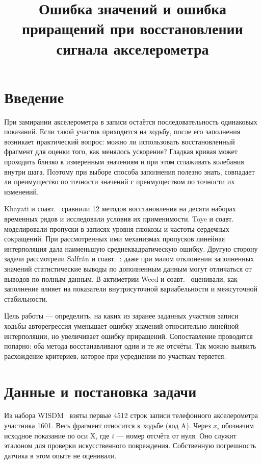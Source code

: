 \documentclass{misisarticle}
\title{Ошибка значений и ошибка приращений при восстановлении сигнала акселерометра}
\begin{document}
\maketitle
\section{Введение}
При замирании акселерометра в записи остаётся последовательность одинаковых показаний. Если такой участок приходится на ходьбу, после его заполнения возникает практический вопрос: можно ли использовать восстановленный фрагмент для оценки того, как менялось ускорение? Гладкая кривая может проходить близко к измеренным значениям и при этом сглаживать колебания внутри шага. Поэтому при выборе способа заполнения полезно знать, совпадает ли преимущество по точности значений с преимуществом по точности их изменений.

Khayati и соавт.~\cite{khayati2020} сравнили 12 методов восстановления на десяти наборах временных рядов и исследовали условия их применимости. Toye и соавт.~\cite{toye2025} моделировали пропуски в записях уровня глюкозы и частоты сердечных сокращений. При рассмотренных ими механизмах пропусков линейная интерполяция дала наименьшую среднеквадратическую ошибку. Другую сторону задачи рассмотрели Salfrán и соавт.~\cite{salfran2016}: даже при малом отклонении заполненных значений статистические выводы по дополненным данным могут отличаться от выводов по полным данным. В актиметрии Weed и соавт.~\cite{weed2022} оценивали, как заполнение влияет на показатели внутрисуточной вариабельности и межсуточной стабильности.

Цель работы --- определить, на каких из заранее заданных участков записи ходьбы авторегрессия уменьшает ошибку значений относительно линейной интерполяции, но увеличивает ошибку приращений. Сопоставление проводится попарно: оба метода восстанавливают одни и те же отсчёты. Так можно выявить расхождение критериев, которое при усреднении по участкам теряется.

\section{Данные и постановка задачи}
Из набора WISDM~\cite{wisdm2019} взяты первые 4512 строк записи телефонного акселерометра участника 1601. Весь фрагмент относится к ходьбе (код A). Через $x_i$ обозначим исходное показание по оси X, где $i$ --- номер отсчёта от нуля. Оно служит эталоном для проверки искусственного повреждения. Собственную погрешность датчика в этом опыте не оценивали.
\end{document}
